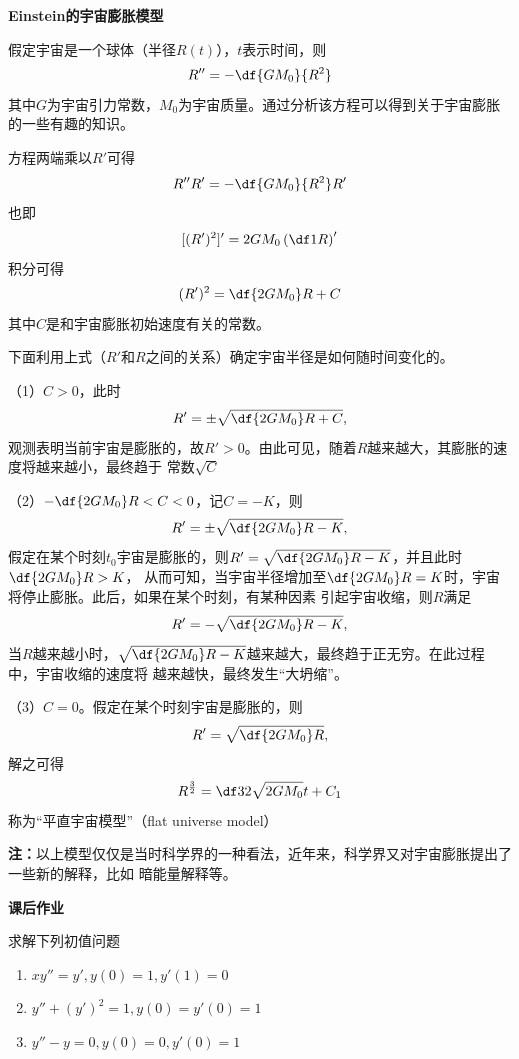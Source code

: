 \begin{shaded}

{\bf Einstein的宇宙膨胀模型}

假定宇宙是一个球体（半径$R(t)$），$t$表示时间，则
$$R''=-\df{GM_0}{R^2}$$
其中$G$为宇宙引力常数，$M_0$为宇宙质量。通过分析该方程可以得到关于宇宙膨胀的一些有趣的知识。

方程两端乘以$R'$可得
$$R''R'=-\df{GM_0}{R^2}R'$$
也即
$$[(R')^2]'=2GM_0\left(\df1R\right)'$$
积分可得
$$(R')^2=\df{2GM_0}R+C$$
其中$C$是和宇宙膨胀初始速度有关的常数。

下面利用上式（$R'$和$R$之间的关系）确定宇宙半径是如何随时间变化的。

（1）$C>0$，此时
$$R'=\pm\sqrt{\df{2GM_0}R+C},$$
观测表明当前宇宙是膨胀的，故$R'>0$。由此可见，随着$R$越来越大，其膨胀的速度将越来越小，最终趋于
常数$\sqrt C$

（2）$-\df{2GM_0}R<C<0$，记$C=-K$，则
$$R'=\pm\sqrt{\df{2GM_0}R-K},$$
假定在某个时刻$t_0$宇宙是膨胀的，则$R'=\sqrt{\df{2GM_0}R-K}$，并且此时$\df{2GM_0}R>K$，
从而可知，当宇宙半径增加至$\df{2GM_0}R=K$时，宇宙将停止膨胀。此后，如果在某个时刻，有某种因素
引起宇宙收缩，则$R$满足
$$R'=-\sqrt{\df{2GM_0}R-K},$$
当$R$越来越小时，$\sqrt{\df{2GM_0}R-K}$越来越大，最终趋于正无穷。在此过程中，宇宙收缩的速度将
越来越快，最终发生“大坍缩”。

（3）$C=0$。假定在某个时刻宇宙是膨胀的，则
$$R'=\sqrt{\df{2GM_0}R},$$
解之可得
$$R^{\frac32}=\df32\sqrt{2GM_0}t+C_1$$
称为“平直宇宙模型”（flat universe model）

{\bf 注：}以上模型仅仅是当时科学界的一种看法，近年来，科学界又对宇宙膨胀提出了一些新的解释，比如
暗能量解释等。

\end{shaded}

\begin{ext}
	{\bf 课后作业}
	
	求解下列初值问题
	\begin{enumerate}
	    \item $xy''=y',y(0)=1,y'(1)=0$
	    \item $y''+(y')^2=1,y(0)=y'(0)=1$
	    \item $y''-y=0,y(0)=0,y'(0)=1$
	\end{enumerate}
\end{ext}

